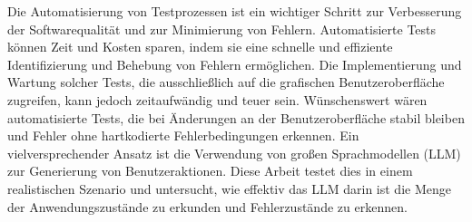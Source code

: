 
\Abstract
Die Automatisierung von Testprozessen ist ein wichtiger Schritt zur Verbesserung der Softwarequalität und zur Minimierung von Fehlern.
Automatisierte Tests können Zeit und Kosten sparen, indem sie eine schnelle und effiziente Identifizierung und Behebung von Fehlern ermöglichen.
Die Implementierung und Wartung solcher Tests, die ausschließlich auf die grafischen Benutzeroberfläche zugreifen, kann jedoch zeitaufwändig und teuer sein.
Wünschenswert wären automatisierte Tests, die bei Änderungen an der Benutzeroberfläche stabil bleiben und Fehler ohne hartkodierte Fehlerbedingungen erkennen.
Ein vielversprechender Ansatz ist die Verwendung von großen Sprachmodellen (LLM) zur Generierung von Benutzeraktionen.
Diese Arbeit testet dies in einem realistischen Szenario und untersucht, wie effektiv das LLM darin ist die Menge der Anwendungszustände zu erkunden und Fehlerzustände zu erkennen.